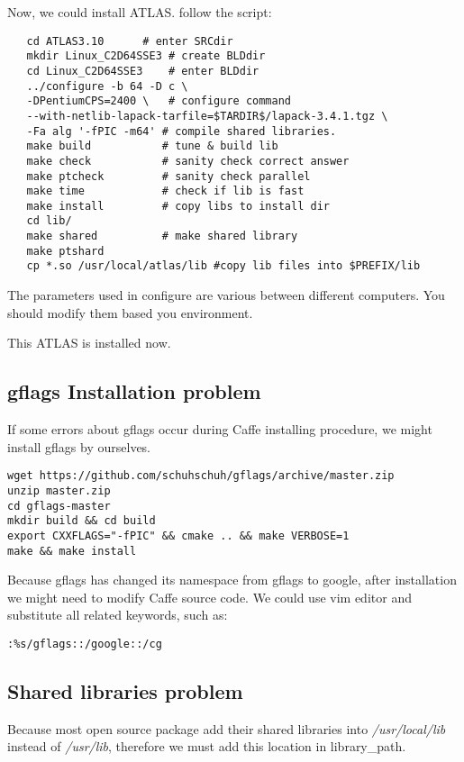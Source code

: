 \documentclass[a4paper, 11pt]{article}
\begin{document}
Now, we could install ATLAS. follow the script\cite{atlas2}:

\begin{lstlisting}
   cd ATLAS3.10		 # enter SRCdir
   mkdir Linux_C2D64SSE3 # create BLDdir
   cd Linux_C2D64SSE3 	 # enter BLDdir
   ../configure -b 64 -D c \
   -DPentiumCPS=2400 \   # configure command
   --with-netlib-lapack-tarfile=$TARDIR$/lapack-3.4.1.tgz \
   -Fa alg '-fPIC -m64'	# compile shared libraries.
   make build 			# tune & build lib
   make check			# sanity check correct answer
   make ptcheck			# sanity check parallel
   make time			# check if lib is fast
   make install			# copy libs to install dir
   cd lib/
   make shared			# make shared library
   make ptshard
   cp *.so /usr/local/atlas/lib #copy lib files into $PREFIX/lib
\end{lstlisting}

The parameters used in configure are various between different computers. You should modify them based you environment. 

This ATLAS is installed now.

\subsection{gflags Installation problem}

If some errors about gflags occur during Caffe installing procedure, we might install gflags by ourselves.

\begin{lstlisting}
wget https://github.com/schuhschuh/gflags/archive/master.zip
unzip master.zip
cd gflags-master
mkdir build && cd build
export CXXFLAGS="-fPIC" && cmake .. && make VERBOSE=1
make && make install
\end{lstlisting}

Because gflags has changed its namespace from gflags to google, after installation we might need to modify Caffe source code. We could use vim editor and  substitute all related keywords, such as:

\begin{lstlisting}
:%s/gflags::/google::/cg
\end{lstlisting}

\subsection{Shared libraries problem}

Because most open source package add their shared libraries into \emph{/usr/local/lib} instead of \emph{/usr/lib}, therefore we must add this location in library\_path.
\end{document}
